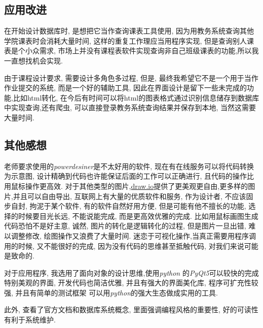 \documentclass{myreport}
\begin{document}
  \subsection{应用改进}
    在开始设计数据库时, 是想把它当作查询课表工具使用,
    因为用教务系统查询其他学院课表时会消耗大量时间,
    这样的重复工作理应当用程序实现,
    但是查询别人课表是个小众需求, 市场上并没有课程表软件实现查询非自己班级课表的功能,所以我一直想找机会实现.

    由于课程设计要求, 需要设计多角色多过程,
    但是, 最终我希望它不是一个用于当作作业提交的系统,
    而是一个好的辅助工具, 因此在界面设计是留下一些未完成的功能,比如html转化, 在今后有时间可以将html的图表格式通过识别信息储存到数据库中实现查询,还有爬虫, 可以直接登录教务系统查询结果并保存到本地, 当然这需要大量时间.
  \subsection{其他感想}

    老师要求使用的\emph{powerdesiner}是不太好用的软件,
    现在有在线服务可以将代码转换为示意图,
    设计精确到代码也许能保证后面的工作可以正确进行,
    且代码的操作比用鼠标操作更高效.
    对于其他类型的图片,\url{draw.io}提供了更美观更自由,更多样的图片,并且可以自由导出,
    互联网上有大量的优质软件和服务,
    作为设计者, 不应该固步自封, 拘泥于某个软件,
    有的软件自然好用方便, 但是可能有他不擅长的功能,
    选择的时候要目光长远, 不能说能完成,
    而是更高效优雅的完成.
    比如用鼠标画图生成代码恐怕不是好主意,
    诚然, 图片的转化是逻辑转化的过程,
    但是图片一旦出错, 难以调整修改,
    绘图操作又浪费了大量时间.
    迷恋于可视化操作,当真正需要用程序调用的时候,
    又不能很好的完成,
    因为没有代码的思维甚至抵触代码,
    对我们来说可能是致命的.


    对于应用程序, 我选用了面向对象的设计思维,使用\emph{python}
    的\emph{PyQt5}可以较快的完成特别美观的界面,
    开发代码也简洁优雅, 并且有强大的界面美化库,
    程序可扩充性较强,
    并且有简单的测试框架
    可以用\emph{python}的强大生态做成实用的工具.

    此外, 查看了官方文档和数据库系统概念,
    里面强调编程风格的重要性,
    好的可读性有利于系统维护.



\end{document}
